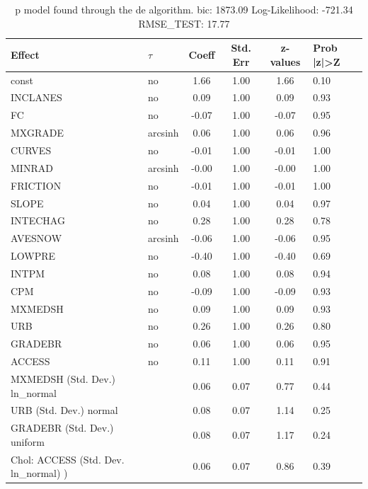 \begin{table}
	\caption{p model found through the de algorithm. bic: 1873.09 Log-Likelihood: -721.34 RMSE_TEST: 17.77}
	\begin{center}
		\begin{tabular}{|l|l|c|c|c|l|}
			\hline
			Effect & $\tau$ & Coeff & Std. Err & z-values & Prob |z|>Z \\
			\hline
			const & no & 1.66 & 1.00 & 1.66 & 0.10 \\
			\hline
			INCLANES & no & 0.09 & 1.00 & 0.09 & 0.93 \\
			\hline
			FC & no & -0.07 & 1.00 & -0.07 & 0.95 \\
			\hline
			MXGRADE & arcsinh & 0.06 & 1.00 & 0.06 & 0.96 \\
			\hline
			CURVES & no & -0.01 & 1.00 & -0.01 & 1.00 \\
			\hline
			MINRAD & arcsinh & -0.00 & 1.00 & -0.00 & 1.00 \\
			\hline
			FRICTION & no & -0.01 & 1.00 & -0.01 & 1.00 \\
			\hline
			SLOPE & no & 0.04 & 1.00 & 0.04 & 0.97 \\
			\hline
			INTECHAG & no & 0.28 & 1.00 & 0.28 & 0.78 \\
			\hline
			AVESNOW & arcsinh & -0.06 & 1.00 & -0.06 & 0.95 \\
			\hline
			LOWPRE & no & -0.40 & 1.00 & -0.40 & 0.69 \\
			\hline
			INTPM & no & 0.08 & 1.00 & 0.08 & 0.94 \\
			\hline
			CPM & no & -0.09 & 1.00 & -0.09 & 0.93 \\
			\hline
			MXMEDSH & no & 0.09 & 1.00 & 0.09 & 0.93 \\
			\hline
			URB & no & 0.26 & 1.00 & 0.26 & 0.80 \\
			\hline
			GRADEBR & no & 0.06 & 1.00 & 0.06 & 0.95 \\
			\hline
			ACCESS & no & 0.11 & 1.00 & 0.11 & 0.91 \\
			\hline
			MXMEDSH (Std. Dev.) ln_normal &  & 0.06 & 0.07 & 0.77 & 0.44 \\
			\hline
			URB (Std. Dev.) normal &  & 0.08 & 0.07 & 1.14 & 0.25 \\
			\hline
			GRADEBR (Std. Dev.) uniform &  & 0.08 & 0.07 & 1.17 & 0.24 \\
			\hline
			 Chol: ACCESS (Std. Dev. ln_normal) ) &  & 0.06 & 0.07 & 0.86 & 0.39 \\
			\hline
		\end{tabular}
	\end{center}
\end{table}